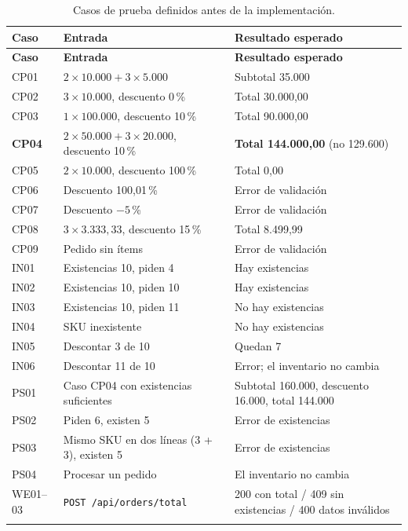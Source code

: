 \documentclass[11pt,a4paper]{article}
\begin{document}
\begin{longtable}{@{}l p{6.6cm} p{5.6cm}@{}}
\toprule
\textbf{Caso} & \textbf{Entrada} & \textbf{Resultado esperado}\\
\midrule
\endfirsthead
\toprule
\textbf{Caso} & \textbf{Entrada} & \textbf{Resultado esperado}\\
\midrule
\endhead
CP01 & $2 \times 10.000 + 3 \times 5.000$ & Subtotal 35.000\\
CP02 & $3 \times 10.000$, descuento 0\,\% & Total 30.000,00\\
CP03 & $1 \times 100.000$, descuento 10\,\% & Total 90.000,00\\
\textbf{CP04} & $2 \times 50.000 + 3 \times 20.000$, descuento 10\,\% & \textbf{Total 144.000,00} (no 129.600)\\
CP05 & $2 \times 10.000$, descuento 100\,\% & Total 0,00\\
CP06 & Descuento 100,01\,\% & Error de validación\\
CP07 & Descuento $-5$\,\% & Error de validación\\
CP08 & $3 \times 3.333{,}33$, descuento 15\,\% & Total 8.499,99\\
CP09 & Pedido sin ítems & Error de validación\\
IN01 & Existencias 10, piden 4 & Hay existencias\\
IN02 & Existencias 10, piden 10 & Hay existencias\\
IN03 & Existencias 10, piden 11 & No hay existencias\\
IN04 & SKU inexistente & No hay existencias\\
IN05 & Descontar 3 de 10 & Quedan 7\\
IN06 & Descontar 11 de 10 & Error; el inventario no cambia\\
PS01 & Caso CP04 con existencias suficientes & Subtotal 160.000, descuento 16.000, total 144.000\\
PS02 & Piden 6, existen 5 & Error de existencias\\
PS03 & Mismo SKU en dos líneas (3 + 3), existen 5 & Error de existencias\\
PS04 & Procesar un pedido & El inventario no cambia\\
WE01--03 & \texttt{POST /api/orders/total} & 200 con total / 409 sin existencias / 400 datos inválidos\\
\bottomrule
\caption{Casos de prueba definidos antes de la implementación.}
\end{longtable}

\end{document}
